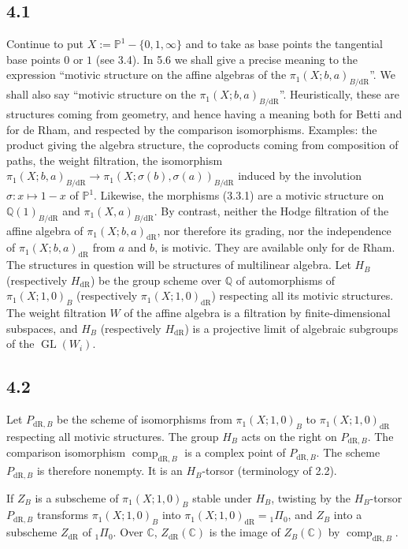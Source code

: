 \documentclass[10pt]{article}
\newcommand{\Q}{\mathbb Q}
\newcommand{\C}{\mathbb C}
\newcommand{\PP}{\mathbb P}
\newcommand{\GL}{\operatorname{GL}}
\newcommand{\comp}{\operatorname{comp}}
\newcommand{\dR}{\mathrm{dR}}
\begin{document}
\subsection*{4.1}
Continue to put $X:=\PP^1-\{0,1,\infty\}$ and to take as base points the tangential base points $0$ or $1$ (see 3.4).
In 5.6 we shall give a precise meaning to the expression ``motivic structure on the affine algebras of the $\pi_1(X;b,a)_{B/\dR}$''.
We shall also say ``motivic structure on the $\pi_1(X;b,a)_{B/\dR}$''.
Heuristically, these are structures coming from geometry, and hence having a meaning both for Betti and for de Rham, and respected by the comparison isomorphisms.
Examples: the product giving the algebra structure, the coproducts coming from composition of paths, the weight filtration, the isomorphism $\pi_1(X;b,a)_{B/\dR}\to\pi_1(X;\sigma(b),\sigma(a))_{B/\dR}$ induced by the involution $\sigma:x\mapsto1-x$ of $\PP^1$.
Likewise, the morphisms (3.3.1) are a motivic structure on $\Q(1)_{B/\dR}$ and $\pi_1(X,a)_{B/\dR}$.
By contrast, neither the Hodge filtration of the affine algebra of $\pi_1(X;b,a)_{\dR}$, nor therefore its grading, nor the independence of $\pi_1(X;b,a)_{\dR}$ from $a$ and $b$, is motivic.
They are available only for de Rham.
The structures in question will be structures of multilinear algebra.
Let $H_B$ (respectively $H_{\dR}$) be the group scheme over $\Q$ of automorphisms of $\pi_1(X;1,0)_B$ (respectively $\pi_1(X;1,0)_{\dR}$) respecting all its motivic structures.
The weight filtration $W$ of the affine algebra is a filtration by finite-dimensional subspaces, and $H_B$ (respectively $H_{\dR}$) is a projective limit of algebraic subgroups of the $\GL(W_i)$.

\subsection*{4.2}
Let $P_{\dR,B}$ be the scheme of isomorphisms from $\pi_1(X;1,0)_B$ to $\pi_1(X;1,0)_{\dR}$ respecting all motivic structures.
The group $H_B$ acts on the right on $P_{\dR,B}$.
The comparison isomorphism $\comp_{\dR,B}$ is a complex point of $P_{\dR,B}$.
The scheme $P_{\dR,B}$ is therefore nonempty.
It is an $H_B$-torsor (terminology of 2.2).

If $Z_B$ is a subscheme of $\pi_1(X;1,0)_B$ stable under $H_B$, twisting by the $H_B$-torsor $P_{\dR,B}$ transforms $\pi_1(X;1,0)_B$ into $\pi_1(X;1,0)_{\dR}={}_1\Pi_0$, and $Z_B$ into a subscheme $Z_{\dR}$ of ${}_1\Pi_0$.
Over $\C$, $Z_{\dR}(\C)$ is the image of $Z_B(\C)$ by $\comp_{\dR,B}$.
\end{document}
